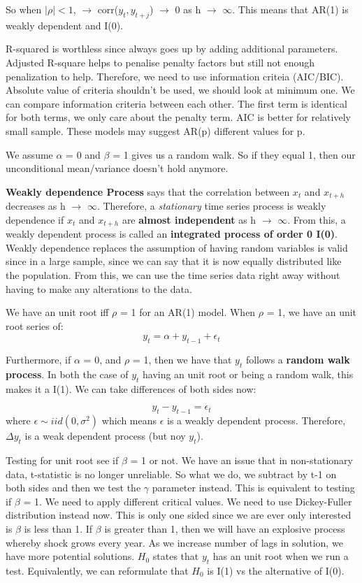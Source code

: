 \documentclass[11pt, oneside]{article}
\theoremstyle{definition}
\begin{document}
So when $|\rho| < 1$, $\rightarrow$ corr($y_t,y_{t+j}$) $\rightarrow$ 0 as h $\rightarrow$ $\infty$. This means that AR(1) is weakly dependent and I(0).



R-squared is worthless since always goes up by adding additional parameters. Adjusted R-square helps to penalise penalty factors but still not enough penalization to help. Therefore, we need to use information criteia (AIC/BIC). Absolute value of criteria shouldn't be used, we should look at minimum one. We can compare information criteria between each other. The first term is identical for both terms, we only care about the penalty term. AIC is better for relatively small sample. These models may suggest AR(p) different values for p.

We assume $\alpha$ = 0 and $\beta$ = 1 gives us a random walk. So if they equal 1, then our unconditional mean/variance doesn't hold anymore.

\textbf{Weakly dependence Process} says that the correlation between $x_t$ and $x_{t+h}$ decreases as h $\rightarrow$ $\infty$. Therefore, a \textit{stationary} time series process is weakly dependence if $x_t$ and $x_{t+h}$ are \textbf{almost independent} as h $\rightarrow$ $\infty$. From this, a weakly dependent process is called an \textbf{integrated process of order 0 I(0)}. Weakly dependence replaces the assumption of having random variables is valid since in a large sample, since we can say that it is now equally distributed like the population. From this, we can use the time series data right away without having to make any alterations to the data.

We have an unit root iff $\rho$ = 1 for an AR(1) model. When $\rho$ = 1, we have an unit root series of:
$$
y_t = \alpha + y_{t-1} + \epsilon_t
$$

Furthermore, if $\alpha$ = 0, and $\rho$ = 1, then we have that $y_t$ follows a \textbf{random walk process}. In both the case of $y_t$ having an unit root or being a random walk, this makes it a I(1). We can take differences of both sides now:

$$
y_t - y_{t-1} = \epsilon_t
$$
where $\epsilon \sim iid(0,\sigma^2)$ which means $\epsilon$ is a weakly dependent process. Therefore, $\Delta y_t$ is a weak dependent process (but noy $y_t$).

Testing for unit root see if $\beta$ = 1 or not. We have an issue that in non-stationary data, t-statistic is no longer unreliable. So what we do, we subtract by t-1 on both sides and then we test the $\gamma$ parameter instead. This is equivalent to testing if $\beta$ = 1. We need to apply different critical values. We need to use Dickey-Fuller distribution instead now. This is only one sided since we are ever only interested is $\beta$ is less than 1. If $\beta$ is greater than 1, then we will have an explosive process whereby shock grows every year. As we increase number of lags in solution, we have more potential solutions. $H_0$ states that $y_t$ has an unit root when we run a test. Equivalently, we can reformulate that $H_0$ is I(1) vs the alternative of I(0).
\end{document}
